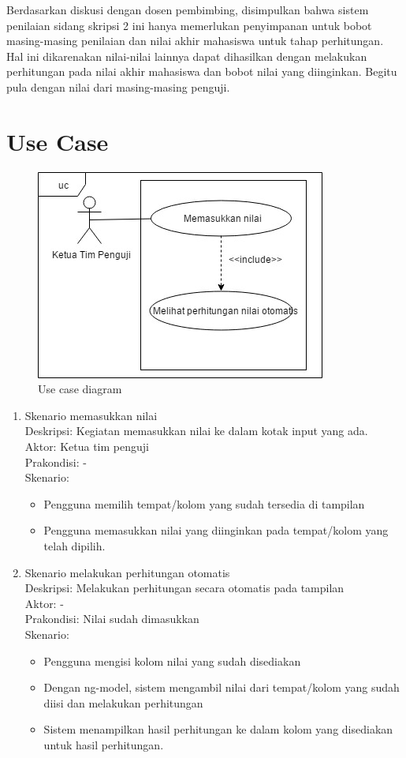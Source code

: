 	Berdasarkan diskusi dengan dosen pembimbing, disimpulkan bahwa sistem penilaian sidang skripsi 2 ini hanya memerlukan penyimpanan untuk bobot masing-masing penilaian dan nilai akhir mahasiswa untuk tahap perhitungan. Hal ini dikarenakan nilai-nilai lainnya dapat dihasilkan dengan melakukan perhitungan pada  nilai akhir mahasiswa dan bobot nilai yang diinginkan. Begitu pula dengan nilai dari masing-masing penguji.
	
\section{Use Case}
\label{sec: usecaseDiagram}

	\begin{figure}[H]
		\centering
		\includegraphics[scale=0.75]{Gambar/usecase}
		\caption{Use case diagram}
		\label{fig:usecase}
	\end{figure}
	
	\begin{enumerate}
		\item Skenario memasukkan nilai\\
			Deskripsi: Kegiatan memasukkan nilai ke dalam kotak input yang ada.\\
			Aktor: Ketua tim penguji\\
			Prakondisi: - \\
			Skenario:
			\begin{itemize}
				\item Pengguna memilih tempat/kolom yang sudah tersedia di tampilan
				\item Pengguna memasukkan nilai yang diinginkan pada tempat/kolom yang telah dipilih.
			\end{itemize}
		\item Skenario melakukan perhitungan otomatis\\
			Deskripsi: Melakukan perhitungan secara otomatis pada tampilan\\
			Aktor: -\\
			Prakondisi: Nilai sudah dimasukkan\\
			Skenario:
			\begin{itemize}
				\item Pengguna mengisi kolom nilai yang sudah disediakan
				\item Dengan ng-model, sistem mengambil nilai dari tempat/kolom yang sudah diisi dan melakukan perhitungan
				\item Sistem menampilkan hasil perhitungan ke dalam kolom yang disediakan untuk hasil perhitungan.
			\end{itemize}
	\end{enumerate}
	